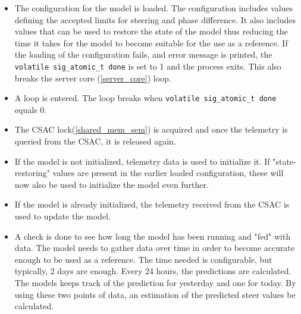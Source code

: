 \documentclass[12pt,english,a4paper]{report}
\begin{document}
\begin{itemize}
  \item The configuration for the model is loaded. The configuration includes values defining the accepted limits for steering and phase difference. It also includes values that can be used to restore the state of the model thus reducing the time it takes for the model to become suitable for the use as a reference. If the loading of the configuration fails, and error message is printed, the \texttt{volatile sig\_atomic\_t done} is set to 1 and the process exits. This also breaks the server core (\ref{server_core}) loop. 
  \item A loop is entered. The loop breaks when \texttt{volatile sig\_atomic\_t done} equals 0. 
  \item The CSAC lock(\ref{shared_mem_sem}) is acquired and once the telemetry is queried from the CSAC, it is released again.
  \item If the model is not initialized, telemetry data is used to initialize it. If "state-restoring" values are present in the earlier loaded configuration, these will now also be used to initialize the model even further.
  \item If the model is already initialized, the telemetry received from the CSAC is used to update the model. 
  \item A check is done to see how long the model has been running and "fed" with data. The model needs to gather data over time in order to become accurate enough to be used as a reference. The time needed is configurable, but typically, 2 days are enough. Every 24 hours, the predictions are calculated. The models keeps track of the prediction for yesterday and one for today. By using these two points of data, an estimation of the predicted steer values be calculated. 
\end{itemize}
\end{document}
